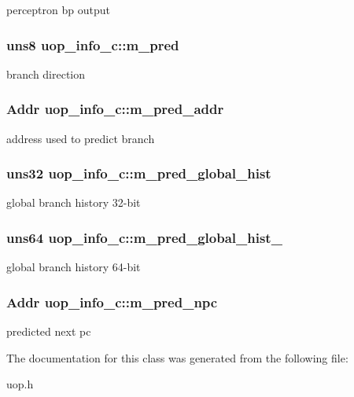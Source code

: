 perceptron bp output \hypertarget{classuop__info__c_acc5127f54e0c7be5ef209831d059c7f4}{
\subsubsection[{m\_\-pred}]{\setlength{\rightskip}{0pt plus 5cm}uns8 {\bf uop\_\-info\_\-c::m\_\-pred}}}
\label{classuop__info__c_acc5127f54e0c7be5ef209831d059c7f4}
branch direction \hypertarget{classuop__info__c_ad6ede550d93c48f32cb874e2a0bc68bd}{
\subsubsection[{m\_\-pred\_\-addr}]{\setlength{\rightskip}{0pt plus 5cm}Addr {\bf uop\_\-info\_\-c::m\_\-pred\_\-addr}}}
\label{classuop__info__c_ad6ede550d93c48f32cb874e2a0bc68bd}
address used to predict branch \hypertarget{classuop__info__c_ac822869e0b96565e5dbe0371aa1eac52}{
\subsubsection[{m\_\-pred\_\-global\_\-hist}]{\setlength{\rightskip}{0pt plus 5cm}uns32 {\bf uop\_\-info\_\-c::m\_\-pred\_\-global\_\-hist}}}
\label{classuop__info__c_ac822869e0b96565e5dbe0371aa1eac52}
global branch history 32-\/bit \hypertarget{classuop__info__c_a719b31d7bef88146a4cfe2bb5e9712e5}{
\subsubsection[{m\_\-pred\_\-global\_\-hist\_\-64}]{\setlength{\rightskip}{0pt plus 5cm}uns64 {\bf uop\_\-info\_\-c::m\_\-pred\_\-global\_\-hist\_}}}
\label{classuop__info__c_a719b31d7bef88146a4cfe2bb5e9712e5}
global branch history 64-\/bit \hypertarget{classuop__info__c_a1883bff1246169e7e708cb8fabeb398b}{
\subsubsection[{m\_\-pred\_\-npc}]{\setlength{\rightskip}{0pt plus 5cm}Addr {\bf uop\_\-info\_\-c::m\_\-pred\_\-npc}}}
\label{classuop__info__c_a1883bff1246169e7e708cb8fabeb398b}
predicted next pc 

The documentation for this class was generated from the following file:\begin{DoxyCompactItemize}
\item 
uop.h\end{DoxyCompactItemize}
